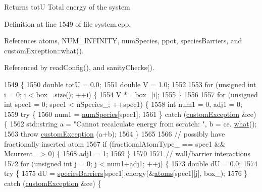 \begin{DoxyReturn}{Returns}
tot\-U Total energy of the system 
\end{DoxyReturn}


Definition at line 1549 of file system.\-cpp.



References atoms, N\-U\-M\-\_\-\-I\-N\-F\-I\-N\-I\-T\-Y, num\-Species, ppot, species\-Barriers, and custom\-Exception\-::what().



Referenced by read\-Config(), and sanity\-Checks().


\begin{DoxyCode}
1549                                        \{
1550     \textcolor{keywordtype}{double} totU = 0.0;
1551     \textcolor{keywordtype}{double} V = 1.0;
1552 
1553     \textcolor{keywordflow}{for} (\textcolor{keywordtype}{unsigned} \textcolor{keywordtype}{int} i = 0; i < box\_.size(); ++i) \{
1554         V *= box\_[i];
1555     \}
1556 
1557     \textcolor{keywordflow}{for} (\textcolor{keywordtype}{unsigned} \textcolor{keywordtype}{int} spec1 = 0; spec1 < nSpecies\_; ++spec1) \{
1558         \textcolor{keywordtype}{int} num1 = 0, adj1 = 0;
1559         \textcolor{keywordflow}{try} \{
1560             num1 = \hyperlink{classsim_system_a9eea865e6dc1cff377b1e79c4d9c23f0}{numSpecies}[spec1];
1561         \} \textcolor{keywordflow}{catch} (\hyperlink{classcustom_exception}{customException} &ce) \{
1562             std::string a = \textcolor{stringliteral}{"Cannot recalculate energy from scratch: "}, b = ce.
      \hyperlink{classcustom_exception_aeb6ab5848b038adfc68fde86a512f691}{what}();
1563             \textcolor{keywordflow}{throw} \hyperlink{classcustom_exception}{customException} (a+b);
1564         \}
1565 
1566         \textcolor{comment}{// possibly have fractionally inserted atom}
1567         \textcolor{keywordflow}{if} (fractionalAtomType\_ == spec1 && Mcurrent\_ > 0) \{
1568             adj1 = 1;
1569         \}
1570 
1571         \textcolor{comment}{// wall/barrier interactions}
1572         \textcolor{keywordflow}{for} (\textcolor{keywordtype}{unsigned} \textcolor{keywordtype}{int} j = 0; j < num1+adj1; ++j) \{
1573             \textcolor{keywordtype}{double} dU = 0.0;
1574             \textcolor{keywordflow}{try} \{
1575                 dU = \hyperlink{classsim_system_a5ae652ff4519f39c3862abae32a9581b}{speciesBarriers}[spec1].energy(&\hyperlink{classsim_system_a90421b19082f7fb8fc23b7264b1161e4}{atoms}[spec1][j], box\_);
1576             \} \textcolor{keywordflow}{catch} (\hyperlink{classcustom_exception}{customException} &ce) \{

\end{DoxyCode}
